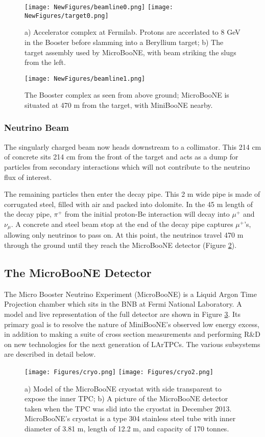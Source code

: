 \documentclass[12pt]{article}
\begin{document}
\begin{figure}[h!]
\texttt{[image: NewFigures/beamline0.png]}
\hspace{3 mm}
\texttt{[image: NewFigures/target0.png]}
\caption{ a) Accelerator complex at Fermilab. Protons are accerlated to 8 GeV in the Booster before slamming into a Beryllium target; b) The target assembly used by MicroBooNE, with beam striking the slugs from the left. } 
\label{fig:beamline0}
\end{figure}

\begin{figure}[h!]
\centering
\texttt{[image: NewFigures/beamline1.png]}
\caption{ The Booster complex as seen from above ground; MicroBooNE is situated at 470 m from the target, with MiniBooNE nearby. }
\label{fig:beamline1}
\end{figure}

\subsubsection{Neutrino Beam}
\par The singularly charged beam now heads downstream to a collimator.  This 214 cm of concrete sits 214 cm from the front of the target and acts as a dump for particles from secondary interactions which will not contribute to the neutrino flux of interest. 
\par The remaining particles then enter the decay pipe.  This 2 m wide pipe is made of corrugated steel, filled with air and packed into dolomite. In the 45 m length of the decay pipe, $\pi^+$ from the initial proton-Be interaction will decay into $\mu^+$ and $\nu_\mu$.  A concrete and steel beam stop at the end of the decay pipe captures $\mu^+$'s, allowing only neutrinos to pass on.  At this point, the neutrinos travel 470 m through the ground until they reach the MicroBooNE detector (Figure \ref{fig:beamline1}).

\subsection{The MicroBooNE Detector}
The Micro Booster Neutrino Experiment (MicroBooNE) is a Liquid Argon Time Projection chamber which sits in the BNB at Fermi National Laboratory. A model and live representation of the full detector are shown in Figure \ref{fig:cryo2}. Its primary goal is to resolve the nature of MiniBooNE's observed low energy excess, in addition to making a suite of cross section measurements and performing R\&D on new technologies for the next generation of LArTPCs. The various subsystems are described in detail below.
\begin{figure}[H]
\centering
\texttt{[image: Figures/cryo.png]}
\hspace{4 mm}
\texttt{[image: Figures/cryo2.png]}
\caption{a) Model of the MicroBooNE cryostat with side transparent to expose the inner TPC; b) A picture of the MicroBooNE detector taken when the TPC was slid into the cryostat in December 2013.  MicroBooNE's cryostat is a type 304 stainless steel tube with inner diameter of 3.81 m, length of 12.2 m, and capacity of 170 tonnes. }
\label{fig:cryo2}
\end{figure}
\end{document}
